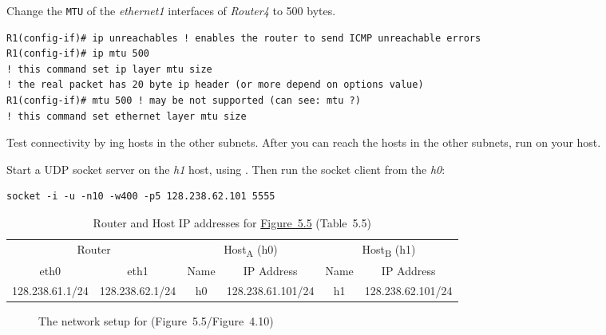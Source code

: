 \documentclass{../UTNetLab}
\begin{document}

Change the \texttt{MTU} of the \textit{ethernet1} interfaces of \textit{Router4} to 500 bytes.
\begin{lstlisting}[language={cisco}]
R1(config-if)# ip unreachables ! enables the router to send ICMP unreachable errors
R1(config-if)# ip mtu 500
! this command set ip layer mtu size
! the real packet has 20 byte ip header (or more depend on options value)
R1(config-if)# mtu 500 ! may be not supported (can see: mtu ?)
! this command set ethernet layer mtu size
    \end{lstlisting}

Test connectivity by ing hosts in the other subnets.
After you can reach the
hosts in the other subnets, run  on your host.

Start a UDP socket server on the \textit{h1} host, using .
Then run the socket client from the \textit{h0}:
\begin{lstlisting}[emph={h1,netlab}]
socket -i -u -n10 -w400 -p5 128.238.62.101 5555
    \end{lstlisting}

\begin{table}[H]
    \caption{Router and Host IP addresses for \hyperref[fig:5.5]{Figure~5.5} (Table~5.5)}
    \centering
    \begin{tabular}{ *2c|*2c|*2c }
        \hline \hline
        \multicolumn{2}{c|}{Router} & \multicolumn{2}{c|}{Host\textsubscript{A} (h0)} & \multicolumn{2}{c}{Host\textsubscript{B} (h1)}                                                \\
        eth0                        & eth1                                            & Name                                           & IP Address        & Name & IP Address        \\
        \hline
        128.238.61.1/24             & 128.238.62.1/24                                 & h0                                             & 128.238.61.101/24 & h1   & 128.238.62.101/24 \\
        \hline \hline
    \end{tabular}
\end{table}

\begin{figure}[H]
    \centering
    \caption{The network setup for  (Figure~5.5/Figure~4.10)}
    \label{fig:5.5}
\end{figure}
\end{document}

